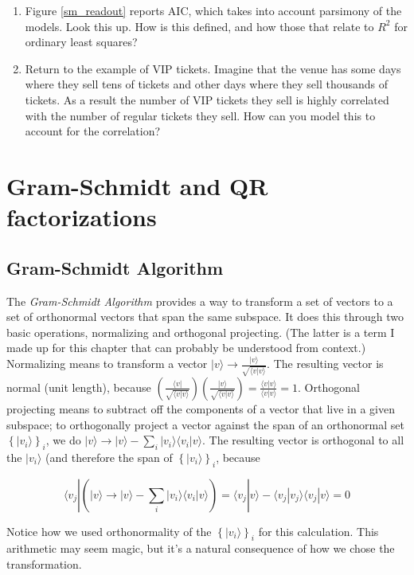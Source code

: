 \documentclass{amsbook}
\begin{document}
\begin{enumerate}
\item Figure \ref{sm_readout} reports AIC, which takes into account parsimony of the models.  Look this up.  How is this defined, and how those that relate to $R^2$ for ordinary least squares?
\item Return to the example of VIP tickets.  Imagine that the venue has some days where they sell tens of tickets and other days where they sell thousands of tickets.  As a result the number of VIP tickets they sell is highly correlated with the number of regular tickets they sell.  How can you model this to account for the correlation?
\end{enumerate}

\section{Gram-Schmidt and QR factorizations}
\subsection{Gram-Schmidt Algorithm}
The {\em Gram-Schmidt Algorithm} provides a way to transform a set of vectors to a set of orthonormal vectors that span the same subspace.  It does this through two basic operations, normalizing and orthogonal projecting.  (The latter is a term I made up for this chapter that can probably be understood from context.)  Normalizing means to transform a vector $|v\rangle\to\frac{|v\rangle}{\sqrt{\langle v|v\rangle}}$.  The resulting vector is normal (unit length), because $\left(\frac{\langle v|}{\sqrt{\langle v|v\rangle}}\right)\left(\frac{|v\rangle}{\sqrt{\langle v|v\rangle}}\right)=\frac{\langle v|v\rangle}{\langle v|v\rangle}=1$.  Orthogonal projecting means to subtract off the components of a vector that live in a given subspace; to orthogonally project a vector against the span of an orthonormal set $\left\{|v_i\rangle\right\}_i$, we do $|v\rangle\to|v\rangle-\sum_i|v_i\rangle\langle v_i|v\rangle$.  The resulting vector is orthogonal to all the $|v_i\rangle$ (and therefore the span of $\left\{|v_i\rangle\right\}_i$, because

$$
\langle v_j|\left(|v\rangle\to|v\rangle-\sum_i|v_i\rangle\langle v_i|v\rangle\right)=\langle v_j|v\rangle - \langle v_j|v_j\rangle\langle v_j|v\rangle = 0
$$

Notice how we used orthonormality of the $\left\{|v_i\rangle\right\}_i$ for this calculation.  This arithmetic may seem magic, but it's a natural consequence of how we chose the transformation.
\end{document}
